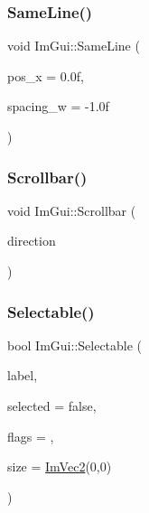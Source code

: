 \subsubsection{\texorpdfstring{Same\+Line()}{SameLine()}}
{\footnotesize\ttfamily void Im\+Gui\+::\+Same\+Line (\begin{DoxyParamCaption}\item[{float}]{pos\+\_\+x = {\ttfamily 0.0f},  }\item[{float}]{spacing\+\_\+w = {\ttfamily -\/1.0f} }\end{DoxyParamCaption})}

\hypertarget{namespace_im_gui_abf1d7a83c5f0a555bbe7f831b0319c8a}{}\label{namespace_im_gui_abf1d7a83c5f0a555bbe7f831b0319c8a} 
\subsubsection{\texorpdfstring{Scrollbar()}{Scrollbar()}}
{\footnotesize\ttfamily void Im\+Gui\+::\+Scrollbar (\begin{DoxyParamCaption}\item[{Im\+Gui\+Layout\+Type}]{direction }\end{DoxyParamCaption})}

\hypertarget{namespace_im_gui_af98575238bda183a523df19fb447af60}{}\label{namespace_im_gui_af98575238bda183a523df19fb447af60} 
\subsubsection{\texorpdfstring{Selectable()}{Selectable()}\hspace{0.1cm}{\footnotesize\ttfamily [1/2]}}
{\footnotesize\ttfamily bool Im\+Gui\+::\+Selectable (\begin{DoxyParamCaption}\item[{const char $\ast$}]{label,  }\item[{bool}]{selected = {\ttfamily false},  }\item[{Im\+Gui\+Selectable\+Flags}]{flags = {},  }\item[{const \hyperlink{struct_im_vec2}{Im\+Vec2} \&}]{size = {\ttfamily \hyperlink{struct_im_vec2}{Im\+Vec2}(0,0)} }\end{DoxyParamCaption})}

\hypertarget{namespace_im_gui_a9229a9c3c304ffc0c98ffe2ee4ff5e40}{}\label{namespace_im_gui_a9229a9c3c304ffc0c98ffe2ee4ff5e40} 
